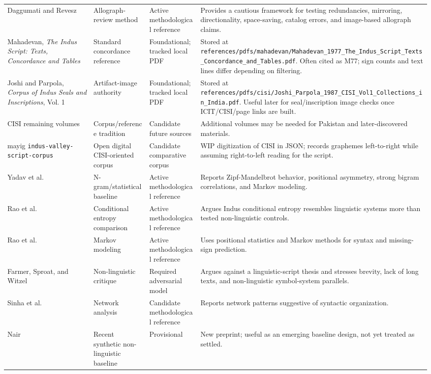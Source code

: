 \begin{longtable}{p{}p{}p{}p{}}
Daggumati and Revesz \citep{daggumati2021allographs} & Allograph-review method & Active methodological reference & Provides a cautious framework for testing redundancies, mirroring, directionality, space-saving, catalog errors, and image-based allograph claims. \\
Mahadevan, \emph{The Indus Script: Texts, Concordance and Tables} \citep{mahadevan1977} & Standard concordance reference & Foundational; tracked local PDF & Stored at \texttt{references/pdfs/mahadevan/Mahadevan\_1977\_The\_Indus\_Script\_Texts\_Concordance\_and\_Tables.pdf}. Often cited as M77; sign counts and text lines differ depending on filtering. \\
Joshi and Parpola, \emph{Corpus of Indus Seals and Inscriptions}, Vol. 1 \citep{joshiParpola1987cisi1} & Artifact-image authority & Foundational; tracked local PDF & Stored at \texttt{references/pdfs/cisi/Joshi\_Parpola\_1987\_CISI\_Vol1\_Collections\_in\_India.pdf}. Useful later for seal/inscription image checks once ICIT/CISI/page links are built. \\
CISI remaining volumes & Corpus/reference tradition & Candidate future sources & Additional volumes may be needed for Pakistan and later-discovered materials. \\
mayig \texttt{indus-valley-script-corpus} & Open digital CISI-oriented corpus & Candidate comparative corpus & WIP digitization of CISI in JSON; records graphemes left-to-right while assuming right-to-left reading for the script. \\
Yadav et al. \citep{yadav2010plosone} & N-gram/statistical baseline & Active methodological reference & Reports Zipf-Mandelbrot behavior, positional asymmetry, strong bigram correlations, and Markov modeling. \\
Rao et al. \citep{rao2009science} & Conditional entropy comparison & Active methodological reference & Argues Indus conditional entropy resembles linguistic systems more than tested non-linguistic controls. \\
Rao et al. \citep{rao2009pnas} & Markov modeling & Active methodological reference & Uses positional statistics and Markov methods for syntax and missing-sign prediction. \\
Farmer, Sproat, and Witzel \citep{farmer2004collapse} & Non-linguistic critique & Required adversarial model & Argues against a linguistic-script thesis and stresses brevity, lack of long texts, and non-linguistic symbol-system parallels. \\
Sinha et al. \citep{sinha2010network} & Network analysis & Candidate methodological reference & Reports network patterns suggestive of syntactic organization. \\
Nair \citep{nair2026progress} & Recent synthetic non-linguistic baseline & Provisional & New preprint; useful as an emerging baseline design, not yet treated as settled. \\
\bottomrule
\end{longtable}

